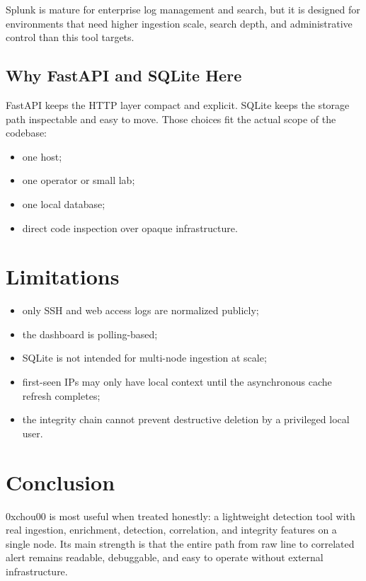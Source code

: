 \documentclass[11pt,a4paper]{article}
\begin{document}
Splunk is mature for enterprise log management and search, but it is designed for environments that need higher ingestion scale, search depth, and administrative control than this tool targets.

\subsection{Why FastAPI and SQLite Here}

FastAPI keeps the HTTP layer compact and explicit. SQLite keeps the storage path inspectable and easy to move. Those choices fit the actual scope of the codebase:

\begin{itemize}[leftmargin=1.5em]
  \item one host;
  \item one operator or small lab;
  \item one local database;
  \item direct code inspection over opaque infrastructure.
\end{itemize}

\section{Limitations}

\begin{itemize}[leftmargin=1.5em]
  \item only SSH and web access logs are normalized publicly;
  \item the dashboard is polling-based;
  \item SQLite is not intended for multi-node ingestion at scale;
  \item first-seen IPs may only have local context until the asynchronous cache refresh completes;
  \item the integrity chain cannot prevent destructive deletion by a privileged local user.
\end{itemize}

\section{Conclusion}

0xchou00 is most useful when treated honestly: a lightweight detection tool with real ingestion, enrichment, detection, correlation, and integrity features on a single node. Its main strength is that the entire path from raw line to correlated alert remains readable, debuggable, and easy to operate without external infrastructure.



\end{document}
